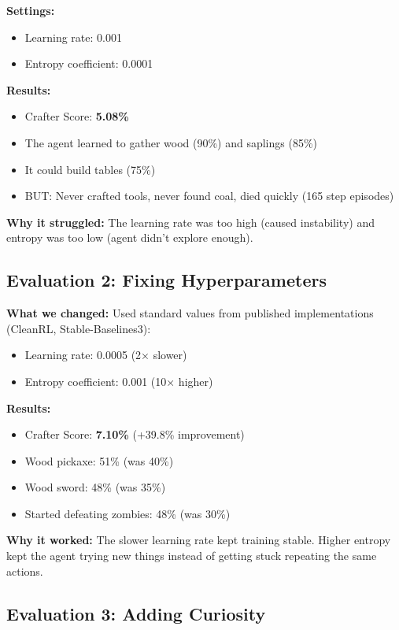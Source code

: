\documentclass[conference]{IEEEtran}
\begin{document}
\textbf{Settings:}
\begin{itemize}
    \item Learning rate: 0.001
    \item Entropy coefficient: 0.0001
\end{itemize}

\textbf{Results:}
\begin{itemize}
    \item Crafter Score: \textbf{5.08\%}
    \item The agent learned to gather wood (90\%) and saplings (85\%)
    \item It could build tables (75\%)
    \item BUT: Never crafted tools, never found coal, died quickly (165 step episodes)
\end{itemize}

\textbf{Why it struggled:} The learning rate was too high (caused instability) and entropy was too low (agent didn't explore enough).

\subsection{Evaluation 2: Fixing Hyperparameters}

\textbf{What we changed:} Used standard values from published implementations (CleanRL, Stable-Baselines3):
\begin{itemize}
    \item Learning rate: 0.0005 (2× slower)
    \item Entropy coefficient: 0.001 (10× higher)
\end{itemize}

\textbf{Results:}
\begin{itemize}
    \item Crafter Score: \textbf{7.10\%} (+39.8\% improvement)
    \item Wood pickaxe: 51\% (was 40\%)
    \item Wood sword: 48\% (was 35\%)
    \item Started defeating zombies: 48\% (was 30\%)
\end{itemize}

\textbf{Why it worked:} The slower learning rate kept training stable. Higher entropy kept the agent trying new things instead of getting stuck repeating the same actions.

\subsection{Evaluation 3: Adding Curiosity}
\end{document}

